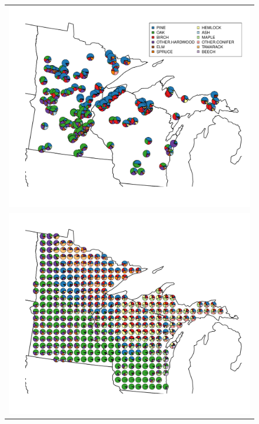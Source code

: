 

\begin{figure}
\centering
\begin{tabular}{c}
\includegraphics[width=5in]{figures/pie_plot_pollen_UMW_v01.pdf} \\
\includegraphics[width=5in]{figures/pie_plot_pls_UMW_v01.pdf}
\end{tabular}
\caption{}
\label{fig:focal_scaled}
\end{figure}

